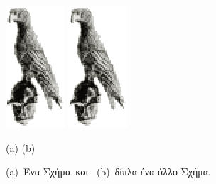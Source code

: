 \begin{figure}[t]
 \centerline{ {\includegraphics[scale=0.9]{Figures/bird.eps}}
              \hskip 2.3in
              {\includegraphics[scale=0.9]{Figures/bird.eps}}}
 \centerline{(a) \hskip 2.5in (b) \hskip 0.1in}
 \centering
 \vspace{0.0cm}
 \caption{(a)~Ένα Σχήμα\  και \  (b)~δίπλα ένα άλλο Σχήμα.}\label{fig1}
\end{figure}
